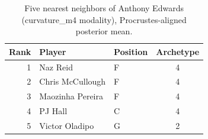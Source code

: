 \begin{table}[htbp]
  \centering\small
  \begin{tabular}{rllc}
    \toprule
    Rank & Player & Position & Archetype \\
    \midrule
    1 & Naz Reid & F & 4 \\
    2 & Chris McCullough & F & 4 \\
    3 & Maozinha Pereira & F & 4 \\
    4 & PJ Hall & C & 4 \\
    5 & Victor Oladipo & G & 2 \\
    \bottomrule
  \end{tabular}
  \caption{Five nearest neighbors of Anthony Edwards (curvature_m4 modality), Procrustes-aligned posterior mean.}
  \label{tab:Anthony_Edwards_neighbors_curvature_m4}
\end{table}


